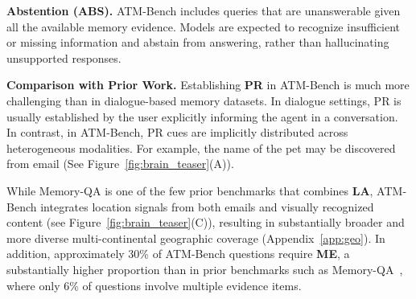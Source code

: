 \documentclass{article}
\theoremstyle{plain}
\theoremstyle{definition}
\theoremstyle{remark}
\begin{document}

\textbf{Abstention (ABS).}
ATM-Bench includes queries that are unanswerable given all the available memory evidence. Models are expected to recognize insufficient or missing information and abstain from answering, rather than hallucinating unsupported responses.

\textbf{Comparison with Prior Work.}
\label{sec:comparisonBenchmark}
Establishing \textbf{PR} in ATM-Bench is much more challenging than in dialogue-based memory datasets.
In dialogue settings, PR is usually established by the user explicitly informing the agent in a conversation.
In contrast, in ATM-Bench, PR cues are implicitly distributed across heterogeneous modalities. For example, the name of the pet may be discovered from email (See Figure~\ref{fig:brain_teaser}(A)).

While Memory-QA is one of the few prior benchmarks that combines \textbf{LA}, ATM-Bench integrates location signals from both emails and visually recognized content (see Figure~\ref{fig:brain_teaser}(C)), resulting in substantially broader and more diverse multi-continental geographic coverage (Appendix~\ref{app:geo}). In addition, approximately 30\% of ATM-Bench questions require \textbf{ME}, a substantially higher proportion than in prior benchmarks such as Memory-QA~\citep{jiang2025memoryqa}, where only 6\% of questions involve multiple evidence items.
\end{document}
